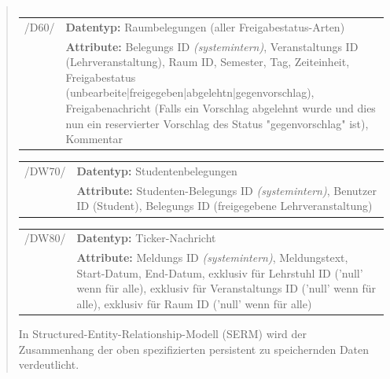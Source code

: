 \begin{quote}
\begin{tabular}{p{1cm}p{12cm}}
\end{tabular}
\begin{tabular}{p{1cm}p{12cm}}
					
	 /D60/	& \textbf{Datentyp:} Raumbelegungen (aller Freigabestatus-Arten) \\
				& \textbf{Attribute:} Belegungs ID \textsl{(systemintern)}, Veranstaltungs ID (Lehrveranstaltung), Raum ID, Semester, Tag, Zeiteinheit, Freigabestatus (unbearbeite|freigegeben|abgelehtn|gegenvorschlag), Freigabenachricht (Falls ein Vorschlag abgelehnt wurde und dies nun ein reservierter Vorschlag des Status "gegenvorschlag" ist), Kommentar  \\[0.25cm]

\end{tabular}
\begin{tabular}{p{1cm}p{12cm}}
		
	 /DW70/& \textbf{Datentyp:} Studentenbelegungen \\
				& \textbf{Attribute:} Studenten-Belegungs ID \textsl{(systemintern)}, Benutzer ID (Student), Belegungs ID (freigegebene Lehrveranstaltung) \\[0.25cm]

\end{tabular}
\begin{tabular}{p{1cm}p{12cm}}
					
	 /DW80/& \textbf{Datentyp:} Ticker-Nachricht \\
				& \textbf{Attribute:} Meldungs ID \textsl{(systemintern)}, Meldungstext, Start-Datum, End-Datum, exklusiv für Lehrstuhl ID ('null' wenn für alle), exklusiv für Veranstaltungs ID ('null' wenn für alle), exklusiv für Raum ID ('null' wenn für alle) \\[0.25cm]
		
\end{tabular}


In Structured-Entity-Relationship-Modell (SERM) wird der Zusammenhang der oben spezifizierten persistent zu speichernden Daten verdeutlicht. \\


\end{quote}
